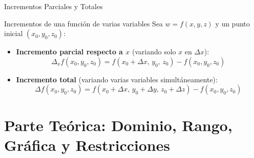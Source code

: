 \documentclass[aspectratio=169,10pt]{beamer}
\begin{document}
\begin{frame}{Incrementos Parciales y Totales}
  \begin{block}{Incrementos de una función de varias variables}
    Sea $w = f(x, y, z)$ y un punto inicial $(x_0, y_0, z_0)$:
    \begin{itemize}
      \item \textbf{Incremento parcial respecto a $x$} (variando solo $x$ en $\Delta x$):
        \[
          \Delta_x f(x_0, y_0, z_0) = f(x_0 + \Delta x,\, y_0,\, z_0) - f(x_0, y_0, z_0)
        \]
      \item \textbf{Incremento total} (variando varias variables simultáneamente):
        \[
          \Delta f(x_0, y_0, z_0) = f(x_0 + \Delta x,\, y_0 + \Delta y,\, z_0 + \Delta z) - f(x_0, y_0, z_0)
        \]
    \end{itemize}
  \end{block}
  \vfill
\end{frame}

\section{Parte Teórica: Dominio, Rango, Gráfica y Restricciones}
\end{document}
